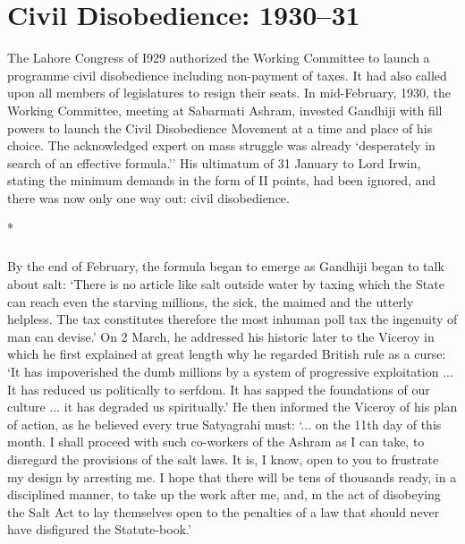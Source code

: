 \chapter{Civil Disobedience: 1930--31}

The Lahore Congress of I929 authorized the Working Committee to launch a programme civil disobedience including non-payment of taxes. It had also called upon all members of legislatures to resign their seats. In mid-February, 1930, the Working Committee, meeting at Sabarmati Ashram, invested Gandhiji with fill powers to launch the Civil Disobedience Movement at a time and place of his choice. The acknowledged expert on mass struggle was already `desperately in search of an effective formula.'' His ultimatum of 31 January to Lord Irwin, stating the minimum demands in the form of II points, had been ignored, and there was now only one way out: civil disobedience.

\begin{center}*\end{center}

\paragraph*{}

By the end of February, the formula began to emerge as Gandhiji began to talk about salt: `There is no article like salt outside water by taxing which the State can reach even the starving millions, the sick, the maimed and the utterly helpless. The tax constitutes therefore the most inhuman poll tax the ingenuity of man can devise.' On 2 March, he addressed his historic later to the Viceroy in which he first explained at great length why he regarded British rule as a curse: `It has impoverished the dumb millions by a system of progressive exploitation ... It has reduced us politically to serfdom. It has sapped the foundations of our culture ... it has degraded us spiritually.' He then informed the Viceroy of his plan of action, as he believed every true Satyagrahi must: `... on the 11th day of this month. I shall proceed with such co-workers of the Ashram as I can take, to disregard the provisions of the salt laws. It is, I know, open to you to frustrate my design by arresting me. I hope that there will be tens of thousands ready, in a disciplined manner, to take up the work after me, and, m the act of disobeying the Salt Act to lay themselves open to the penalties of a law that should never have disfigured the Statute-book.'

